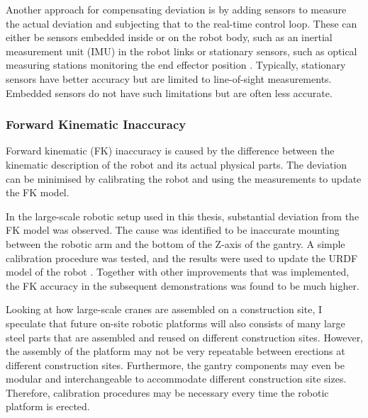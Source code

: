 Another approach for compensating deviation is by adding sensors to measure the actual deviation and subjecting that to the real-time control loop. These can either be sensors embedded inside or on the robot body, such as an inertial measurement unit (IMU) in the robot links \parencite{judHEAPAutonomousWalking2021} or stationary sensors, such as optical measuring stations monitoring the end effector position \parencite{stadelmannEndEffectorPoseCorrection2019}. Typically, stationary sensors have better accuracy but are limited to line-of-sight measurements. Embedded sensors do not have such limitations but are often less accurate. 

\subsubsection{Forward Kinematic Inaccuracy}
\label{subsubsection:new-hypo-forward-kinematic-inaccuracy}

Forward kinematic (FK) inaccuracy is caused by the difference between the kinematic description of the robot and its actual physical parts. The deviation can be minimised by calibrating the robot \parencite{chen-gangReviewKinematicsCalibration2014, mooringFundamentalsManipulatorCalibration1991} and using the measurements to update the FK model.

In the large-scale robotic setup used in this thesis, substantial deviation from the FK model was observed. The cause was identified to be inaccurate mounting between the robotic arm and the bottom of the Z-axis of the gantry. A simple calibration procedure was tested, and the results were used to update the URDF model of the robot . Together with other improvements that was implemented, the FK accuracy in the subsequent demonstrations was found to be much higher.

Looking at how large-scale cranes are assembled on a construction site, I speculate that future on-site robotic platforms will also consists of many large steel parts that are assembled and reused on different construction sites. However, the assembly of the platform may not be very repeatable between erections at different construction sites. Furthermore, the gantry components may even be modular and interchangeable to accommodate different construction site sizes. Therefore, calibration procedures may be necessary every time the robotic platform is erected.
